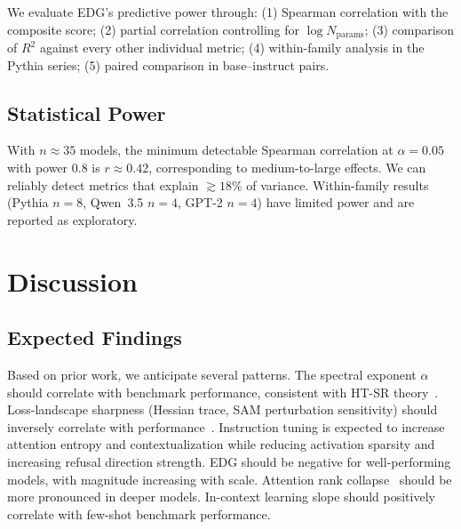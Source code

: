 \documentclass{article}
\begin{document}
We evaluate EDG's predictive power through:
(1) Spearman correlation with the composite score;
(2) partial correlation controlling for $\log N_{\text{params}}$;
(3) comparison of $R^2$ against every other individual metric;
(4) within-family analysis in the Pythia series;
(5) paired comparison in base--instruct pairs.

\subsection{Statistical Power}
\label{sec:power}

With $n \approx 35$ models, the minimum detectable Spearman correlation at $\alpha = 0.05$ with power $0.8$ is $r \approx 0.42$, corresponding to medium-to-large effects.
We can reliably detect metrics that explain $\gtrsim\!18\%$ of variance.
Within-family results (Pythia $n=8$, Qwen~3.5 $n=4$, GPT-2 $n=4$) have limited power and are reported as exploratory.

\section{Discussion}
\label{sec:discussion}

\subsection{Expected Findings}

Based on prior work, we anticipate several patterns.
The spectral exponent $\alpha$ should correlate with benchmark performance, consistent with HT-SR theory~\citep{martin2021implicit}.
Loss-landscape sharpness (Hessian trace, SAM perturbation sensitivity) should inversely correlate with performance~\citep{foret2021sharpness}.
Instruction tuning is expected to increase attention entropy and contextualization while reducing activation sparsity and increasing refusal direction strength.
EDG should be negative for well-performing models, with magnitude increasing with scale.
Attention rank collapse~\citep{dong2021attention} should be more pronounced in deeper models.
In-context learning slope should positively correlate with few-shot benchmark performance.
\end{document}
